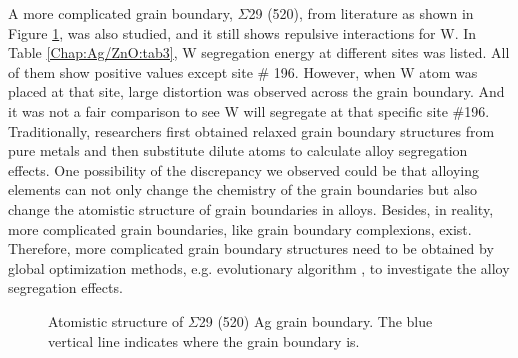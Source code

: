 A more complicated grain boundary, $\Sigma$29 (520), from literature \cite{zhu2018predicting} as shown in Figure \ref{Chap:Ag/ZnO:fig20}, was also studied, and it still shows repulsive interactions for W. In Table \ref{Chap:Ag/ZnO:tab3}, W segregation energy at different sites was listed. All of them show positive values except site \# 196. However, when W atom was placed at that site, large distortion was observed across the grain boundary. And it was not a fair comparison to see W will segregate at that specific site \#196.  Traditionally, researchers first obtained relaxed grain boundary structures from pure metals and then substitute dilute atoms to calculate alloy segregation effects. One possibility of the discrepancy we observed could be that alloying elements can not only change the chemistry of the grain boundaries but also change the atomistic structure of grain boundaries in alloys. Besides, in reality, more complicated grain boundaries, like grain boundary complexions, exist. \cite{cantwell2014grain} Therefore, more complicated grain boundary structures need to be obtained by global optimization methods, e.g. evolutionary algorithm \cite{yang2020grain}, to investigate the alloy segregation effects.


\begingroup
\begin{figure}[!ht]
  \centering
  \caption[Atomistic structure of $\Sigma$29 (520) Ag grain boundary.]{Atomistic structure of $\Sigma$29 (520) Ag grain boundary. The blue vertical line indicates where the grain boundary is.}
  \label{Chap:Ag/ZnO:fig20}
\end{figure}
\endgroup

